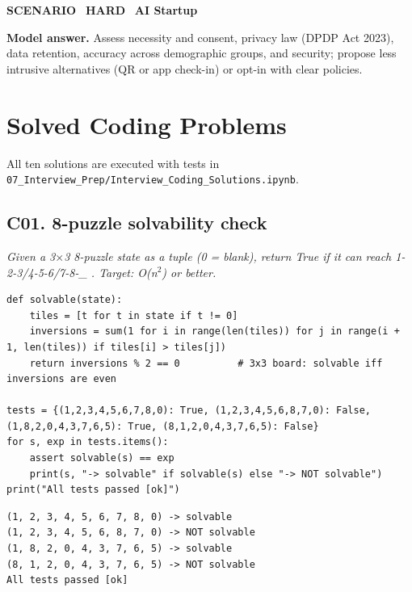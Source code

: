 \documentclass[11pt]{article}
\begin{document}
\begin{tcolorbox}[enhanced,breakable,colback=white,colframe=leaf,arc=2mm,boxrule=0.8pt,left=3mm,right=3mm,
 title={\textbf{QV.15}\quad A client wants face recognition for classroom attendance. What do you advise?},fonttitle=\color{white}\small,colbacktitle=leaf]
\colorbox{leaf!15}{\scriptsize\bfseries\color{leaf} SCENARIO}\
\colorbox{crimson!15}{\scriptsize\bfseries\color{crimson} HARD}\
\colorbox{navy!8}{\scriptsize\bfseries\color{navy} AI Startup}\par\smallskip
\textbf{\color{navy}Model answer.} Assess necessity and consent, privacy law (DPDP Act 2023), data retention, accuracy across demographic groups, and security; propose less intrusive alternatives (QR or app check-in) or opt-in with clear policies.
\end{tcolorbox}
\newpage
\section*{Solved Coding Problems}
All ten solutions are executed with tests in \texttt{07\_Interview\_Prep/Interview\_Coding\_Solutions.ipynb}.
\subsection*{C01. 8-puzzle solvability check \hfill{}}
\textit{Given a 3$\times$3 8-puzzle state as a tuple (0 = blank), return True if it can reach 1-2-3/4-5-6/7-8-\_ . Target: O(n$^2$) or better.}
\begin{lstlisting}[style=py]
def solvable(state):
    tiles = [t for t in state if t != 0]
    inversions = sum(1 for i in range(len(tiles)) for j in range(i + 1, len(tiles)) if tiles[i] > tiles[j])
    return inversions % 2 == 0          # 3x3 board: solvable iff inversions are even

tests = {(1,2,3,4,5,6,7,8,0): True, (1,2,3,4,5,6,8,7,0): False, (1,8,2,0,4,3,7,6,5): True, (8,1,2,0,4,3,7,6,5): False}
for s, exp in tests.items():
    assert solvable(s) == exp
    print(s, "-> solvable" if solvable(s) else "-> NOT solvable")
print("All tests passed [ok]")
\end{lstlisting}
\begin{lstlisting}[style=out]
(1, 2, 3, 4, 5, 6, 7, 8, 0) -> solvable
(1, 2, 3, 4, 5, 6, 8, 7, 0) -> NOT solvable
(1, 8, 2, 0, 4, 3, 7, 6, 5) -> solvable
(8, 1, 2, 0, 4, 3, 7, 6, 5) -> NOT solvable
All tests passed [ok]
\end{lstlisting}
\end{document}
